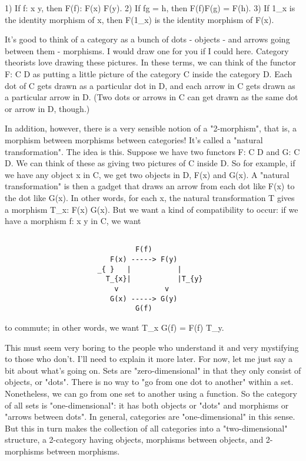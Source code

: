 1) If f: x \to  y, then F(f): F(x) \to  F(y).
2) If fg = h, then F(f)F(g) = F(h). 
3) If 1_{x} is the identity morphism of x, then F(1_{x}) is the identity
   morphism of F(x). 

It's good to think of a category as a bunch of dots - objects - and
arrows going between them - morphisms.  I would draw one for you if I
could here.  Category theorists love drawing these pictures.  In these
terms, we can think of the functor F: C \to  D as putting a little picture
of the category C inside the category D.  Each dot of C gets drawn as a
particular dot in D, and each arrow in C gets drawn as a particular
arrow in D.  (Two dots or arrows in C can get drawn as the same dot or
arrow in D, though.)  


In addition, however, there is a very sensible notion of a
"2-morphism", that is, a morphism between morphisms between
categories!  It's called a "natural transformation".  The idea
is this.  Suppose we have two functors F: C \to  D and G: C \to  D.
We can think of these as giving two pictures of C inside D.  So for
example, if we have any object x in C, we get two objects in D, F(x) and
G(x).  A "natural transformation" is then a gadget that draws
an arrow from each dot like F(x) to the dot like G(x).  In other words,
for each x, the natural transformation T gives a morphism T_{x}:
F(x) \to  G(x).  But we want a kind of compatibility to occur: if we
have a morphism f: x \to  y in C, we want


\begin{verbatim}

                               F(f)
                         F(x) -----> F(y)
                      _{ }   |           |
                        T_{x}|           |T_{y}
                          v           v
                         G(x) -----> G(y)
                               G(f)

\end{verbatim}
    
to commute; in other words, we want T_{x} G(f) = F(f) T_{y}.  

This must seem very boring to the people who understand it and very
mystifying to those who don't.  I'll need to explain it more later.  For
now, let me just say a bit about what's going on.  Sets are
"zero-dimensional" in that they only consist of objects, or
"dots".  There is no way to "go from one dot to
another" within a set.  Nonetheless, we can go from one set to
another using a function.  So the category of all sets is
"one-dimensional": it has both objects or "dots" and
morphisms or "arrows between dots".  In general, categories
are "one-dimensional" in this sense.  But this in turn makes
the collection of all categories into a "two-dimensional"
structure, a 2-category having objects, morphisms between objects, and
2-morphisms between morphisms.  

